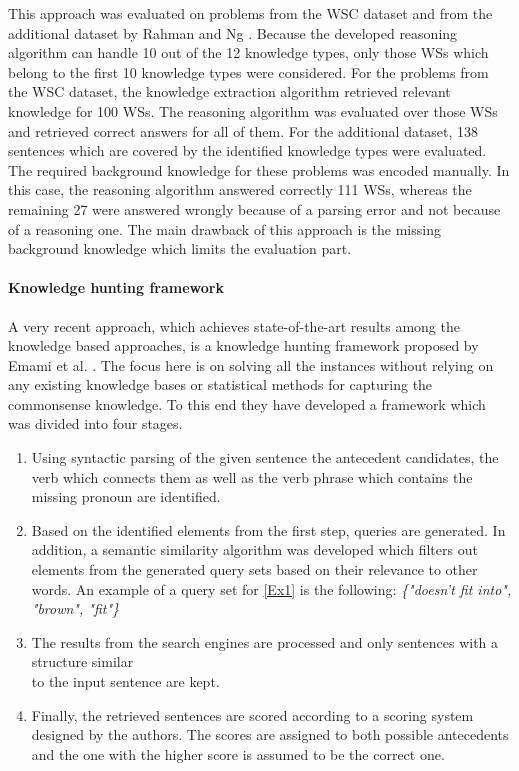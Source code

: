 This approach was evaluated on problems from the WSC dataset and from the additional dataset by Rahman and Ng \cite{DBLP:conf/emnlp/RahmanN12}. Because the developed reasoning algorithm can handle 10 out of the 12 knowledge types, only those WSs which belong to the first 10 knowledge types were considered. For the problems from the WSC dataset, the knowledge extraction algorithm retrieved relevant knowledge for 100 WSs. The reasoning algorithm was evaluated over those WSs and retrieved correct answers for all of them.  
For the additional dataset, 138 sentences which are covered by the identified knowledge types were evaluated. The required background knowledge for these problems was encoded manually. In this case, the reasoning algorithm answered correctly 111 WSs, whereas the remaining 27 were answered wrongly because of a parsing error and not because of a reasoning one. The main drawback of this approach is the missing background knowledge which limits the evaluation part. 
 
\paragraph{Knowledge hunting framework}
A very recent approach, which achieves state-of-the-art results among the knowledge based approaches, is a knowledge hunting framework proposed by Emami et al. \cite{DBLP:conf/emnlp/EmamiCTSC18}. The focus here is on solving all the instances without relying on any existing knowledge bases or statistical methods for capturing the commonsense knowledge. To this end they have developed a framework which was divided into four stages.
\begin{enumerate}
	\item Using syntactic parsing of the given sentence the antecedent candidates, the verb which connects them as well as the verb phrase which contains the missing pronoun are identified.
	\item Based on the identified elements from the first step, queries are generated. In addition, a semantic similarity algorithm was developed which filters out elements from the generated query sets based on their relevance to other words.
	An example of a query set for \ref{Ex1} is the following: \textit{\{"doesn't fit into", "brown", "fit"\}}
	\item The results from the search engines are processed and only sentences with a structure similar \\to the input sentence are kept.
	\item Finally, the retrieved sentences are scored according to a scoring system designed by the authors. The scores are assigned to both possible antecedents and the one with the higher score is assumed to be the correct one.
\end{enumerate}

